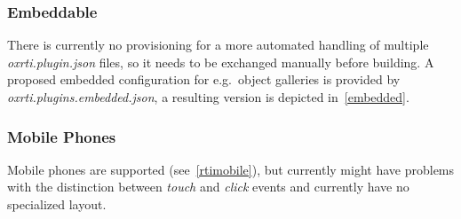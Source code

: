 \subsubsection{Embeddable}
There is currently no provisioning for a more automated handling of multiple
\emph{oxrti.plugin.json} files, so it needs to be exchanged manually before
building. A proposed embedded configuration for e.g.\ object galleries is provided by
\emph{oxrti.plugins.embedded.json}, a resulting version is depicted
in~\autoref{embedded}.

\subsubsection{Mobile Phones}
Mobile phones are supported (see~\autoref{rtimobile}), but currently might have
problems with the distinction between \emph{touch} and \emph{click} events and
currently have no specialized layout.
